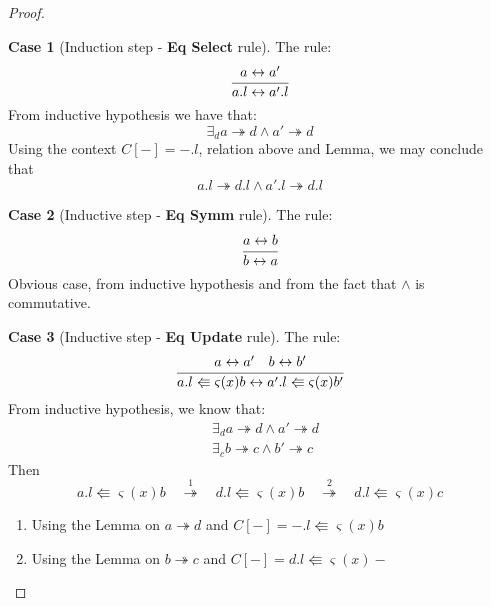 \documentclass[a4paper,11pt]{article}
\theoremstyle{definition}
\newtheorem{case}{Case}
\begin{document}
\begin{proof}
 \begin{case}[Induction step - \textbf{Eq Select} rule] The rule: \\
  \begin{equation*}
   \cfrac{a \leftrightarrow a'}{a.l \leftrightarrow a'.l}
  \end{equation*}
  From inductive hypothesis we have that:
  \begin{equation*}
   \exists_d a \twoheadrightarrow d \wedge a' \twoheadrightarrow d
  \end{equation*}
  Using the context $C[-] = -.l$, relation above and Lemma, we may conclude that
  \begin{equation*}
   a.l \twoheadrightarrow d.l \wedge a'.l \twoheadrightarrow d.l
  \end{equation*}
 \end{case}
 
 \begin{case}[Inductive step - \textbf{Eq Symm} rule] The rule: \\
  \begin{equation*}
   \cfrac{a \leftrightarrow b}{b \leftrightarrow a}
  \end{equation*}
  Obvious case, from inductive hypothesis and from the fact that $\wedge$ is commutative.
 \end{case}
 
 \begin{case}[Inductive step - \textbf{Eq Update} rule] The rule: \\
  \begin{equation*}
   \cfrac{a \leftrightarrow a' \quad b \leftrightarrow b'}{a.l \Lleftarrow \varsigma(x)b \leftrightarrow a'.l \Lleftarrow \varsigma(x)b'}
  \end{equation*}
  From inductive hypothesis, we know that:
  \begin{align*}
   & \exists_d a \twoheadrightarrow d \wedge a' \twoheadrightarrow d \\
   & \exists_c b \twoheadrightarrow c \wedge b' \twoheadrightarrow c
  \end{align*}
  Then
  \begin{equation*}
   a.l \Lleftarrow \varsigma(x)b \quad \stackrel{1}{\twoheadrightarrow} \quad
   d.l \Lleftarrow \varsigma(x)b \quad \stackrel{2}{\twoheadrightarrow} \quad
   d.l \Lleftarrow \varsigma(x)c
  \end{equation*}
  \begin{enumerate}
   \item Using the Lemma on $a \twoheadrightarrow d$ and $C[-] = -.l \Lleftarrow \varsigma(x)b$
   \item Using the Lemma on $b \twoheadrightarrow c$ and $C[-] = d.l \Lleftarrow \varsigma(x)-$
  \end{enumerate}
  

\end{case}
\end{proof}
\end{document}
